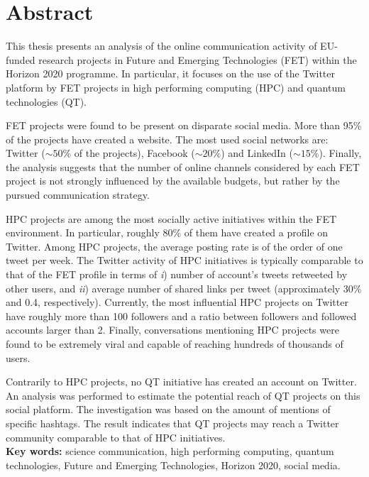 \chapter*{Abstract}
This thesis presents an analysis of the online communication activity of EU-funded research projects in Future and Emerging Technologies (FET) within the Horizon 2020 programme. In particular, it focuses on the use of the Twitter platform by FET projects in high performing computing (HPC) and quantum technologies (QT).

FET projects were found to be present on disparate social media. More than 95\% of the projects have created a website. The most used social networks are: Twitter ($\sim 50\%$ of the projects), Facebook ($\sim 20\%$) and LinkedIn ($\sim 15\%$). Finally, the analysis suggests that the number of online channels considered by each FET project is not strongly influenced by the available budgets, but rather by the pursued communication strategy.

HPC projects are among the most socially active initiatives within the FET environment. In particular, roughly 80\% of them have created a profile on Twitter. Among HPC projects, the average posting rate is of the order of one tweet per week. The Twitter activity of HPC initiatives is typically comparable to that of the FET profile in terms of \textit{i}) number of account's tweets retweeted by other users, and \textit{ii}) average number of shared links per tweet (approximately 30\% and 0.4, respectively). Currently, the most influential HPC projects on Twitter have roughly more than 100 followers and a ratio between followers and followed accounts larger than 2. Finally, conversations mentioning HPC projects were found to be extremely viral and capable of reaching hundreds of thousands of users.

Contrarily to HPC projects, no QT initiative has created an account on Twitter. An analysis was performed to estimate the potential reach of QT projects on this social platform. The investigation was based on the amount of mentions of specific hashtags. The result indicates that QT projects may reach a Twitter community comparable to that of HPC initiatives. \\

\noindent
\textbf{Key words:} science communication, high performing computing, quantum technologies, Future and Emerging Technologies, Horizon 2020, social media.